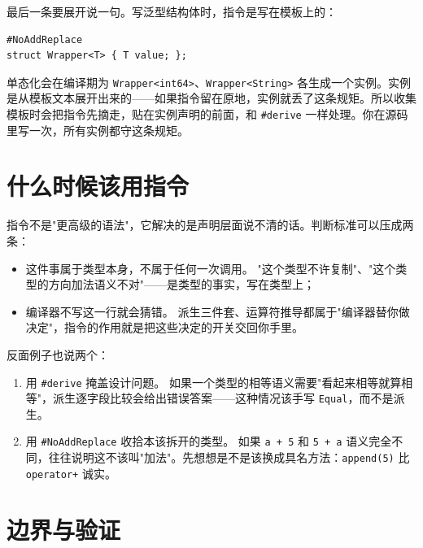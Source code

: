 最后一条要展开说一句。写泛型结构体时，指令是写在模板上的：

\par
\medskip
\begin{lstlisting}[style=chali]
#NoAddReplace
struct Wrapper<T> { T value; };
\end{lstlisting}
\par
\medskip

单态化会在编译期为 \texttt{Wrapper<\allowbreak{}int64>\allowbreak{}}、\texttt{Wrapper<\allowbreak{}String>\allowbreak{}} 各生成一个实例。实例是从模板文本展开出来的——如果指令留在原地，实例就丢了这条规矩。所以收集模板时会把指令先摘走，贴在实例声明的前面，和 \texttt{\#derive} 一样处理。你在源码里写一次，所有实例都守这条规矩。

\section{什么时候该用指令}

指令不是"更高级的语法"，它解决的是声明层面说不清的话。判断标准可以压成两条：

\begin{itemize}

\item 这件事属于类型本身，不属于任何一次调用。 "这个类型不许复制"、"这个类型的方向加法语义不对"——是类型的事实，写在类型上；

\item 编译器不写这一行就会猜错。 派生三件套、运算符推导都属于"编译器替你做决定"，指令的作用就是把这些决定的开关交回你手里。

\end{itemize}

反面例子也说两个：

\begin{enumerate}

\item 用 \texttt{\#derive} 掩盖设计问题。 如果一个类型的相等语义需要"看起来相等就算相等"，派生逐字段比较会给出错误答案——这种情况该手写 \texttt{Equal}，而不是派生。

\item 用 \texttt{\#No\allowbreak{}Add\allowbreak{}Replace} 收拾本该拆开的类型。 如果 \texttt{a + 5} 和 \texttt{5 + a} 语义完全不同，往往说明这不该叫"加法"。先想想是不是该换成具名方法：\texttt{append(\allowbreak{}5)\allowbreak{}} 比 \texttt{operator+} 诚实。

\end{enumerate}

\section{边界与验证}

